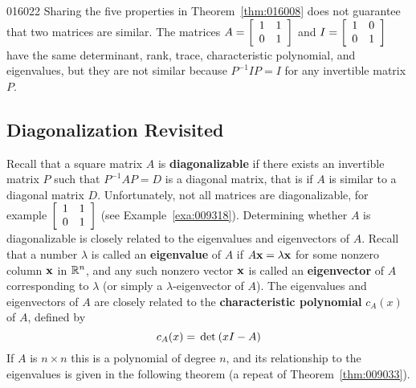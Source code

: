 \begin{example}{}{016022}
Sharing the five properties in Theorem~\ref{thm:016008} does not guarantee that two matrices are similar. The matrices 
$A =
\left[ \begin{array}{rr}
1 & 1 \\
0 & 1
\end{array} \right]
$ and $ I =
\left[ \begin{array}{rr}
1 & 0 \\
0 & 1
\end{array} \right]$ have the same determinant, rank, trace, characteristic polynomial, and eigenvalues, but they are not similar because $P^{-1}IP = I$ for any invertible matrix $P$.
\end{example}

\subsection*{Diagonalization Revisited}

Recall that a square matrix $A$ is \textbf{diagonalizable} if there exists an invertible matrix $P$ such that $P^{-1}AP = D$ is a diagonal matrix, that is if $A$ is similar to a diagonal matrix $D$. Unfortunately, not all matrices are diagonalizable, for example 
$\left[ \begin{array}{rr}
1 & 1 \\
0 & 1
\end{array} \right]$
 (see Example~\ref{exa:009318}). Determining whether $A$ is diagonalizable is closely related to the eigenvalues and eigenvectors of $A$. Recall that a number $\lambda$ is called an \textbf{eigenvalue} of $A$ if $A\textbf{x} = \lambda\textbf{x}$ for some nonzero column $\textbf{x}$ in $\mathbb{R}^n$, and any such nonzero vector $\textbf{x}$ is called an \textbf{eigenvector} of $A$ corresponding to $\lambda$ (or simply a $\lambda$-eigenvector of $A$). The eigenvalues and eigenvectors of $A$ are closely related to the \textbf{characteristic polynomial} $c_{A}(x)$ of $A$, defined by
\begin{equation*}
c_A(x) = \thinspace\operatorname{det\medspace} (xI - A)
\end{equation*}
If $A$ is $n \times n$ this is a polynomial of degree $n$, and its relationship to the eigenvalues is given in the following theorem (a repeat of Theorem~\ref{thm:009033}).

